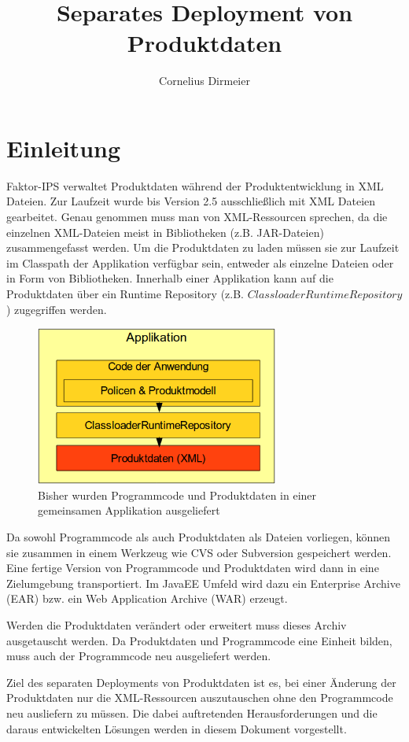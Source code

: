 \documentclass[headsepline=true, footsepline=true]{scrartcl}
\title{Separates Deployment von Produktdaten}
\author{Cornelius Dirmeier}
\begin{document}
\maketitle

\section{Einleitung}

Faktor-IPS verwaltet Produktdaten während der Produktentwicklung in XML Dateien.
Zur Laufzeit wurde bis Version 2.5 ausschließlich mit XML
Dateien gearbeitet. Genau genommen muss man von XML-Ressourcen sprechen, da die
einzelnen XML-Dateien meist in Bibliotheken (z.B. JAR-Dateien) zusammengefasst
werden. Um die Produktdaten zu laden müssen sie zur Laufzeit im Classpath der
Applikation verfügbar sein, entweder als einzelne Dateien oder in Form von
Bibliotheken. Innerhalb einer Applikation kann auf die Produktdaten über ein
Runtime Repository (z.B. $ClassloaderRuntimeRepository$) zugegriffen werden.

\begin{figure}[htb] \centering
\includegraphics[width=8cm]{./pics/old_architecture.png} \caption{Bisher wurden
Programmcode und Produktdaten in einer gemeinsamen Applikation ausgeliefert}
\label{old_architecture}
\end{figure}

Da sowohl Programmcode als auch Produktdaten als Dateien vorliegen, können sie
zusammen in einem Werkzeug wie CVS oder Subversion gespeichert werden. Eine
fertige Version von Programmcode und Produktdaten wird dann in eine Zielumgebung
transportiert. Im JavaEE Umfeld wird dazu ein Enterprise Archive (EAR) bzw. ein
Web Application Archive (WAR) erzeugt.

Werden die Produktdaten verändert oder erweitert muss dieses Archiv ausgetauscht
werden. Da Produktdaten und Programmcode eine Einheit bilden, muss auch der
Programmcode neu ausgeliefert werden.

Ziel des separaten Deployments von Produktdaten ist es, bei einer Änderung der
Produktdaten nur die XML-Ressourcen auszutauschen ohne den Programmcode neu
ausliefern zu müssen. Die dabei auftretenden Herausforderungen und die daraus
entwickelten Lösungen werden in diesem Dokument vorgestellt.
\end{document}
